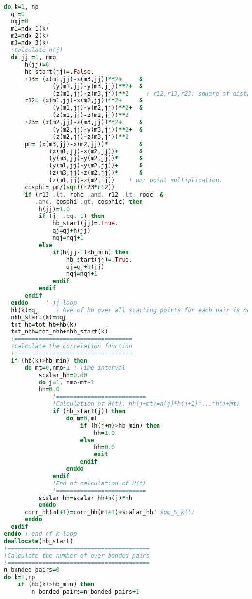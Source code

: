 \begin{lstlisting}[language=fortran]
do k=1, np
  qj=0
  nqj=0
  m1=ndx_1(k)
  m2=ndx_2(k)
  m3=ndx_3(k)
  !Calculate h(j)
  do jj =1, nmo
      h(jj)=0
      hb_start(jj)=.False.
      r13= (x(m1,jj)-x(m3,jj))**2+     &
              (y(m1,jj)-y(m3,jj))**2+  &
              (z(m1,jj)-z(m3,jj))**2     ! r12,r13,r23: square of distance
      r12= (x(m1,jj)-x(m2,jj))**2+     &
              (y(m1,jj)-y(m2,jj))**2+  &
              (z(m1,jj)-z(m2,jj))**2
      r23= (x(m2,jj)-x(m3,jj))**2+     &
              (y(m2,jj)-y(m3,jj))**2+  &
              (z(m2,jj)-z(m3,jj))**2
      pm= (x(m3,jj)-x(m2,jj))*         &
             (x(m1,jj)-x(m2,jj))+      &
             (y(m3,jj)-y(m2,jj))*      &
             (y(m1,jj)-y(m2,jj))+      &
             (z(m3,jj)-z(m2,jj))*      &
             (z(m1,jj)-z(m2,jj))    ! pm: point multiplication.
      cosphi= pm/(sqrt(r23*r12))
      if (r13 .lt. rohc .and. r12 .lt. rooc  &
         .and. cosphi .gt. cosphic) then
          h(jj)=1.0
          if (jj .eq. 1) then
              hb_start(jj)=.True.
              qj=qj+h(jj)
              nqj=nqj+1
          else
              if(h(jj-1)<h_min) then
                  hb_start(jj)=.True.
                  qj=qj+h(jj)
                  nqj=nqj+1
              endif
          endif
      endif
  enddo     ! jj-loop
  hb(k)=qj     ! Ave of hb over all starting points for each pair is not necessary in the calculation of S(t)
  nhb_start(k)=nqj
  tot_hb=tot_hb+hb(k)
  tot_nhb=tot_nhb+nhb_start(k)
  !==================================
  !Calculate the correlation function
  !==================================
  if (hb(k)>hb_min) then
      do mt=0,nmo-1 ! Time interval
          scalar_hh=0.d0
          do j=1, nmo-mt-1
          hh=0.0
              !==========================
              !Calculation of H(t): hh(j+mt)=h(j)*h(j+1)*...*h(j+mt)
              if (hb_start(j)) then
                  do m=0,mt
                      if (h(j+m)>hb_min) then
                          hh=1.0
                      else
                          hh=0.0
                          exit
                      endif
                  enddo
              endif
              !End of calculation of H(t)
              !==========================
          scalar_hh=scalar_hh+h(j)*hh
          enddo
      corr_hh(mt+1)=corr_hh(mt+1)+scalar_hh! sum_S_k(t)
      enddo
  endif
enddo ! end of k-loop
deallocate(hb_start)
!=========================================
!Calculate the number of ever bonded pairs
!=========================================
n_bonded_pairs=0
do k=1,np
    if (hb(k)>hb_min) then
        n_bonded_pairs=n_bonded_pairs+1

\end{lstlisting}
